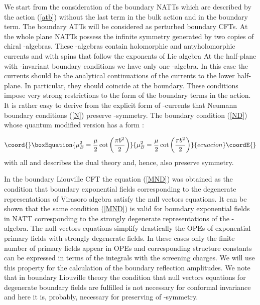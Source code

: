 \documentclass[a4paper,12pt]{article}
\begin{document}
We start from the consideration of the boundary NATTs which are described by
the action (\ref{atb}) without the last term in the bulk action and \coordHE{}
in the boundary term. The boundary ATTs will be considered as perturbed
boundary CFTs.  At the whole plane NATTs possess the
infinite symmetry generated by two copies of chiral \coordHE{}-algebras. These 
\coordHE{}-algebras contain \coordHE{} holomorphic and \coordHE{} antyholomorphic currents 
\coordHE{} and \coordHE{} with spins that follow the
exponents of Lie algebra \coordHE{} At the half-plane with \coordHE{}-invariant boundary
conditions we have only one \coordHE{}-algebra. In this case the currents 
\coordHE{} should be the analytical continuations of the
currents \coordHE{} to the lower half-plane. In particular, they should
coincide at the boundary. These conditions impose very strong restrictions
to the form of the boundary terms in the action. It is rather easy to derive
from the explicit form of \coordHE{}-currents \cite{FL} that Neumann boundary
conditions (\ref{N}) preserve \coordHE{}-symmetry. The boundary condition (\ref{ND}) 
whose quantum modified version has a form \cite{FZZA}:

\begin{equation}\coord{}\boxEquation{
\mu _B^2=\frac \mu 2\cot \left( \frac{\pi b^2}2\right)
\label{MND}
}{
\mu _B^2=\frac \mu 2\cot \left( \frac{\pi b^2}2\right)
}{ecuacion}\coordE{}\end{equation}
with all \coordHE{} and \coordHE{} describes the dual theory and, hence, 
also preserve \coordHE{}symmetry. 

In the
boundary Liouville CFT \cite{FZZA} the equation (\ref{MND}) was obtained as
the condition that boundary exponential fields corresponding to the
degenerate representations of Virasoro algebra satisfy the null vectors
equations. It can be shown that the same condition (\ref{MND}) is valid for
boundary exponential fields in NATT corresponding to the strongly degenerate
representations of the \coordHE{}-algebra. The null vectors equations simplify
drastically the OPEs of exponential primary fields with strongly degenerate 
fields. In these cases only the finite number of primary fields appear in OPEs 
and corresponding structure constants can be expressed in terms of the 
integrals with the screening charges. We will use this
property for the calculation of the boundary reflection amplitudes. We note
that in boundary Liouville theory the condition that null vectors equations 
for degenerate boundary fields are fulfilled is not necessary for conformal 
invariance and here it is, 
probably, necessary for preserving of \coordHE{}-symmetry.
\end{document}
